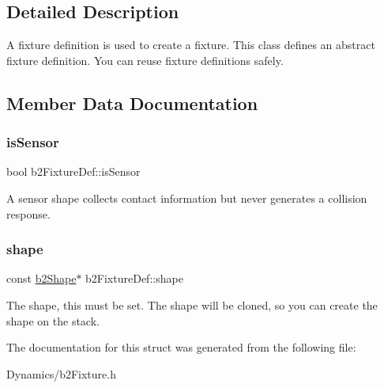\subsection{Detailed Description}
A fixture definition is used to create a fixture. This class defines an abstract fixture definition. You can reuse fixture definitions safely. 

\subsection{Member Data Documentation}
\mbox{\label{structb2FixtureDef_ac8cfcc6208663c92861eaab3b3fdc57e}} 
\subsubsection{\texorpdfstring{is\+Sensor}{isSensor}}
{\footnotesize\ttfamily bool b2\+Fixture\+Def\+::is\+Sensor}

A sensor shape collects contact information but never generates a collision response. \mbox{\label{structb2FixtureDef_a1e41753d89abf3443e7897e2498a3240}} 
\subsubsection{\texorpdfstring{shape}{shape}}
{\footnotesize\ttfamily const \mbox{\hyperlink{classb2Shape}{b2\+Shape}}$\ast$ b2\+Fixture\+Def\+::shape}

The shape, this must be set. The shape will be cloned, so you can create the shape on the stack. 

The documentation for this struct was generated from the following file\+:\begin{DoxyCompactItemize}
\item 
Dynamics/b2\+Fixture.\+h\end{DoxyCompactItemize}
